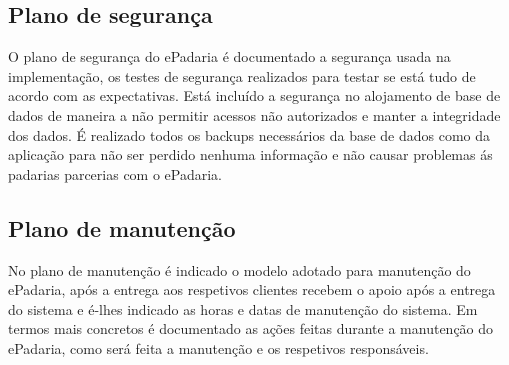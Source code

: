 \subsection{Plano de segurança}
O plano de segurança do ePadaria é documentado a segurança usada na implementação, os testes de segurança realizados para testar se está tudo de acordo com as expectativas. Está incluído a segurança no alojamento de base de dados de maneira a não permitir acessos não autorizados e manter a integridade dos dados. É realizado todos os backups necessários da base de dados como da aplicação para não ser perdido nenhuma informação e não causar problemas ás padarias parcerias com o ePadaria.

\subsection{Plano de manutenção}
No plano de manutenção é indicado o modelo adotado para manutenção do ePadaria, após a entrega aos respetivos clientes recebem o apoio após a entrega do sistema e é-lhes indicado as horas e datas de manutenção do sistema. Em termos mais concretos é documentado as ações feitas durante a manutenção do ePadaria, como será feita a manutenção e os respetivos responsáveis.